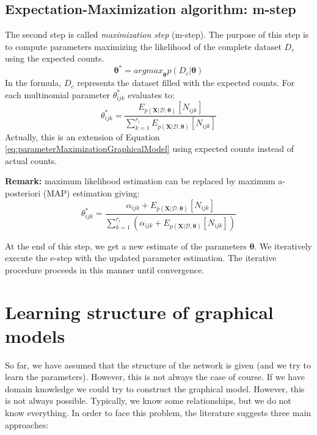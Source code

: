 \subsection{Expectation-Maximization algorithm: m-step}
The second step is called \textit{maximization step} (m-step). The purpose of this step is to compute parameters maximizing the likelihood of the complete dataset $D_c$ using the expected counts.
\begin{equation}
    \pmb{\theta}^* = \mathit{argmax}_{\pmb{\theta}}p(D_c|\pmb{\theta})
\end{equation}
In the formula, $D_c$ represents the dataset filled with the expected counts.
For each multinomial parameter $\theta^*_{ijk}$ evaluates to:
\begin{equation}
    \theta^*_{ijk} = \frac{E_{p(\pmb{X}|\mathcal{D}, \pmb{\theta})}[N_{ijk}]}{\sum_{k=1}^{r_i} E_{p(\pmb{X}|\mathcal{D}, \pmb{\theta})}[N_{ijk}]}
\end{equation}
Actually, this is an extension of Equation \ref{eq:parameterMaximizationGraphicalModel} using expected counts instead of actual counts. \newline

\textbf{Remark:} maximum likelihood estimation can be replaced by maximum a-posteriori (MAP) estimation giving:
\begin{equation}
    \theta^*_{ijk} = \frac{\alpha_{ijk} + E_{p(\pmb{X}|\mathcal{D}, \pmb{\theta})}[N_{ijk}]}{\sum_{k=1}^{r_i} (\alpha_{ijk}+E_{p(\pmb{X}|\mathcal{D}, \pmb{\theta})}[N_{ijk}])}
\end{equation}

At the end of this step, we get a new estimate of the parameters $\pmb{\theta}$. We iteratively execute the e-step with the updated parameter estimation. The iterative procedure proceeds in this manner until convergence.

\section{Learning structure of graphical models}
So far, we have assumed that the structure of the network is given (and we try to learn the parameters). However, this is not always the case of course. If we have domain knowledge we could try to construct the graphical model. However, this is not always possible. Typically, we know some relationships, but we do not know everything. In order to face this problem, the literature suggests three main approaches:

